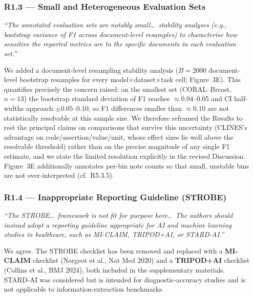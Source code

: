\documentclass[11pt,letterpaper]{article}
\newcommand{\reviewer}[1]{\par\medskip\textcolor{blue!75!black}{\textit{#1}}\par\medskip}
\newcommand{\response}[1]{\par#1\par\medskip}
\begin{document}
\subsubsection*{R1.3 --- Small and Heterogeneous Evaluation Sets}
\reviewer{``The annotated evaluation sets are notably small\dots\ stability analyses (e.g., bootstrap variance of F1 across document-level resamples) to characterise how sensitive the reported metrics are to the specific documents in each evaluation set.''}
\response{We added a document-level resampling stability analysis ($B=2000$ document-level bootstrap resamples for every model$\times$dataset$\times$task cell; Figure~3E). This quantifies precisely the concern raised: on the smallest set (CORAL--Breast, $n=13$) the bootstrap standard deviation of F1 reaches $\approx 0.04$--0.05 and CI half-widths approach $\pm 0.05$--0.10, so F1 differences smaller than $\approx 0.10$ are not statistically resolvable at this sample size. We therefore reframed the Results to rest the principal claims on comparisons that survive this uncertainty (CLINES's advantage on code/assertion/value/unit, whose effect sizes lie well above the resolvable threshold) rather than on the precise magnitude of any single F1 estimate, and we state the limited resolution explicitly in the revised Discussion. Figure~3E additionally annotates per-bin note counts so that small, unstable bins are not over-interpreted (cf.\ R5.3.5).}

\subsubsection*{R1.4 --- Inappropriate Reporting Guideline (STROBE)}
\reviewer{``The STROBE\dots\ framework is not fit for purpose here\dots\ The authors should instead adopt a reporting guideline appropriate for AI and machine learning studies in healthcare, such as MI-CLAIM, TRIPOD+AI, or STARD-AI.''}
\response{We agree. The STROBE checklist has been removed and replaced with a \textbf{MI-CLAIM} checklist (Norgeot et al., Nat Med 2020) and a \textbf{TRIPOD+AI} checklist (Collins et al., BMJ 2024), both included in the supplementary materials. STARD-AI was considered but is intended for diagnostic-accuracy studies and is not applicable to information-extraction benchmarks.}
\end{document}
